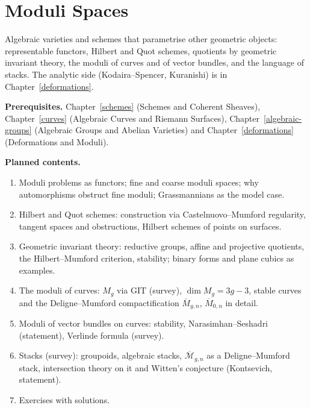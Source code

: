 \chapter{Moduli Spaces}\label{moduli-spaces}

Algebraic varieties and schemes that parametrise other geometric objects: representable functors, Hilbert and Quot schemes, quotients by geometric invariant theory, the moduli of curves and of vector
bundles, and the language of stacks. The analytic side (Kodaira--Spencer, Kuranishi) is in Chapter~\ref{deformations}.

\noindent\textbf{Prerequisites.} Chapter~\ref{schemes} (Schemes and Coherent Sheaves), Chapter~\ref{curves} (Algebraic Curves and Riemann Surfaces), Chapter~\ref{algebraic-groups} (Algebraic Groups and
Abelian Varieties) and Chapter~\ref{deformations} (Deformations and Moduli).

\noindent\textbf{Planned contents.}
\begin{enumerate}
\item Moduli problems as functors; fine and coarse moduli spaces; why automorphisms obstruct fine moduli; Grassmannians as the model case.
\item Hilbert and Quot schemes: construction via Castelnuovo--Mumford regularity, tangent spaces and obstructions, Hilbert schemes of points on surfaces.
\item Geometric invariant theory: reductive groups, affine and projective quotients, the Hilbert--Mumford criterion, stability; binary forms and plane cubics as examples.
\item The moduli of curves: $M_g$ via GIT (survey), $\dim M_g = 3g - 3$, stable curves and the Deligne--Mumford compactification $\overline{M}_{g,n}$, $\overline{M}_{0,n}$ in detail.
\item Moduli of vector bundles on curves: stability, Narasimhan--Seshadri (statement), Verlinde formula (survey).
\item Stacks (survey): groupoids, algebraic stacks, $\overline{\mathcal{M}}_{g,n}$ as a Deligne--Mumford stack, intersection theory on it and Witten's conjecture (Kontsevich, statement).
\item Exercises with solutions.
\end{enumerate}

